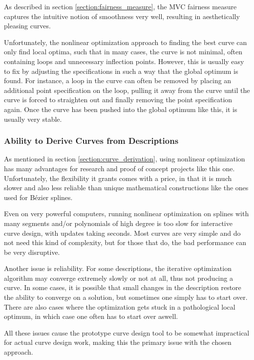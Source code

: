 \documentclass[a4paper]{article}
\begin{document}
				As described in section \ref{section:fairness_measure}, the MVC fairness measure captures the intuitive notion of smoothness very well, resulting in aesthetically pleasing curves.

				Unfortunately, the nonlinear optimization approach to finding the best curve can only find local optima, such that in many cases, the curve is not minimal, often containing loops and unnecessary inflection points. However, this is usually easy to fix by adjusting the specifications in such a way that the global optimum is found. For instance, a loop in the curve can often be removed by placing an additional point specification on the loop, pulling it away from the curve until the curve is forced to straighten out and finally removing the point specification again. Once the curve has been pushed into the global optimum like this, it is usually very stable.

			\subsubsection{Ability to Derive Curves from Descriptions}
			\label{section:ability_derive_curves_descriptions}

				As mentioned in section \ref{section:curve_derivation}, using nonlinear optimization has many advantages for research and proof of concept projects like this one. Unfortunately, the flexibility it grants comes with a price, in that it is much slower and also less reliable than unique mathematical constructions like the ones used for Bézier splines.

				Even on very powerful computers, running nonlinear optimization on splines with many segments and/or polynomials of high degree is too slow for interactive curve design, with updates taking seconds. Most curves are very simple and do not need this kind of complexity, but for those that do, the bad performance can be very disruptive.

				Another issue is reliability. For some descriptions, the iterative optimization algorithm may converge extremely slowly or not at all, thus not producing a curve. In some cases, it is possible that small changes in the description restore the ability to converge on a solution, but sometimes one simply has to start over. There are also cases where the optimization gets stuck in a pathological local optimum, in which case one often has to start over aswell.

				All these issues cause the prototype curve design tool to be somewhat impractical for actual curve design work, making this the primary issue with the chosen approach.
\end{document}
